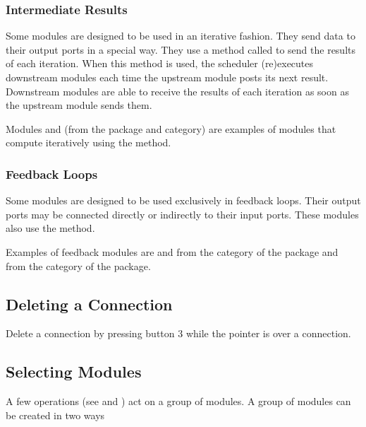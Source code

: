 \subsubsection{Intermediate Results}

Some modules are designed to be used in an iterative fashion.  They send
data to their output ports in a special way.  They use a method called
 to send the results of each iteration.  When
this method is used, the scheduler (re)executes downstream modules each time
the upstream module posts its next result.  Downstream modules are
able to receive the results of each iteration as soon as the
upstream module sends them.

Modules  and  (from the
\package{\sr} package and  category) are examples of modules
that compute iteratively using the  method.

\subsubsection{Feedback Loops}

Some modules are designed to be used exclusively in feedback loops. Their output ports may be connected
directly or indirectly to their input ports.  These modules also use the
 method.

Examples of feedback modules are  and
 from the  category of the
 package and  from the
 category of the  package.

\subsection{Deleting a Connection}
\label{sec:deleteconnections}

Delete a connection by pressing button 3 while the pointer is
over a connection.

\subsection{Selecting Modules}
\label{sec:selectmods}

A few operations (see  and
) act on a group of
modules.  A group of modules can be created in two ways

